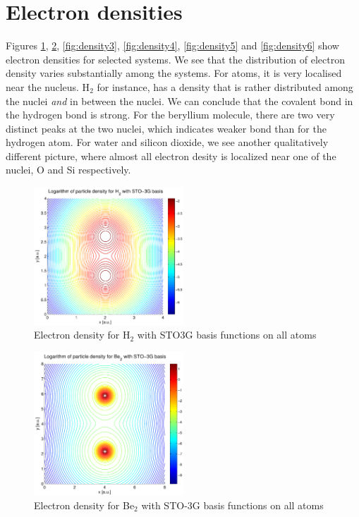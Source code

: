 \documentclass[a4paper,10pt, twocolumn, pre]{revtex4}
\begin{document}
\section{Electron densities}
Figures \ref{fig:density1}, \ref{fig:density2}, \ref{fig:density3}, \ref{fig:density4}, \ref{fig:density5} and \ref{fig:density6} show electron densities for selected systems. We see that the distribution of electron density varies substantially among the systems. For atoms, it is very localised near the nucleus. H$_2$ for instance, has a density that is rather distributed among the nuclei \emph{and} in between the nuclei. We can conclude that the covalent bond in the hydrogen bond is strong. For the beryllium molecule, there are two very distinct peaks at the two nuclei, which indicates weaker bond than for the hydrogen atom. For water and silicon dioxide, we see another qualitatively different picture, where almost all electron desity is localized near one of the nuclei, O and Si respectively. 



\begin{figure}[h!tb]
\includegraphics[width=0.5\textwidth]{./figures/H2density_sto3g.pdf}
\caption{Electron density for H$_2$ with STO3G basis functions on all atoms}
\label{fig:density1}
\end{figure}

\begin{figure}[h!tb]
\includegraphics[width=0.5\textwidth]{./figures/Be2density_sto3g.pdf}
\caption{Electron density for Be$_2$ with STO-3G basis functions on all atoms}
\label{fig:density2}
\end{figure}
\end{document}
